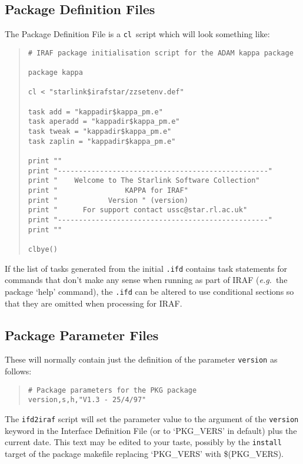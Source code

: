 \documentclass[twoside,11pt]{article}
\newcommand{\xref}[3]{#1}
\newcommand{\xlabel}[1]{}
\newcommand{\cl}{\texttt{cl}}
\begin{document}
\subsection{\xlabel{package_definition_files}Package Definition Files\label{pkg_def_files}}
The Package Definition File is a \cl\ script which will look something like:
\begin{quote} \begin{verbatim}
# IRAF package initialisation script for the ADAM kappa package

package kappa

cl < "starlink$irafstar/zzsetenv.def"

task add = "kappadir$kappa_pm.e"
task aperadd = "kappadir$kappa_pm.e"
task tweak = "kappadir$kappa_pm.e"
task zaplin = "kappadir$kappa_pm.e"

print ""
print "--------------------------------------------------"
print "    Welcome to The Starlink Software Collection"
print "                KAPPA for IRAF"
print "            Version " (version)
print "      For support contact ussc@star.rl.ac.uk"
print "--------------------------------------------------"
print ""

clbye()
\end{verbatim} \end{quote}
If the list of tasks generated from the initial \texttt{.ifd} contains
task statements for commands that don't make any sense when running as part
of IRAF (\textit{e.g.}\ the package `help' command), the \texttt{.ifd} can be
altered to use
\xref{conditional sections}{ssn68}{conditional_sections}
so that they are omitted when processing for IRAF.

\subsection{\xlabel{package_parameter_files}Package Parameter Files}
These will normally contain just the definition of the parameter
\texttt{version} as follows:
\begin{quote} \begin{verbatim}
# Package parameters for the PKG package
version,s,h,"V1.3 - 25/4/97"
\end{verbatim} \end{quote}
The
\xref{\texttt{ifd2iraf}}{ssn68}{producing_iraf_files_from_an_ifd}
script will set the parameter value to the argument of
the
\xref{\texttt{version}}{ssn68}{version}
keyword in the Interface Definition File (or to `PKG\_VERS' in default) plus
the current date. This text may be edited to your taste, possibly by the
\texttt{install} target of the package makefile replacing `PKG\_VERS' with
\$(PKG\_VERS).
\end{document}
